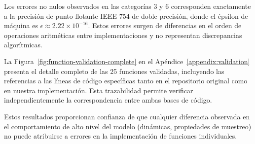 \begin{table}[H]
\centering
\caption{Resumen de validación función por función contra código original de Echeveste ($N = 10\,000$ muestras por función).}
\label{tab:function_validation_summary}
\end{table}

Los errores no nulos observados en las categorías 3 y 6 corresponden exactamente a la precisión de punto flotante IEEE 754 de doble precisión, donde el épsilon de máquina es $\epsilon \approx 2.22 \times 10^{-16}$. Estos errores surgen de diferencias en el orden de operaciones aritméticas entre implementaciones y no representan discrepancias algorítmicas.

La Figura~\ref{fig:function-validation-complete} en el Apéndice~\ref{appendix:validation} presenta el detalle completo de las 25 funciones validadas, incluyendo las referencias a las líneas de código específicas tanto en el repositorio original como en nuestra implementación. Esta trazabilidad permite verificar independientemente la correspondencia entre ambas bases de código.

Estos resultados proporcionan confianza de que cualquier diferencia observada en el comportamiento de alto nivel del modelo (dinámicas, propiedades de muestreo) no puede atribuirse a errores en la implementación de funciones individuales.

